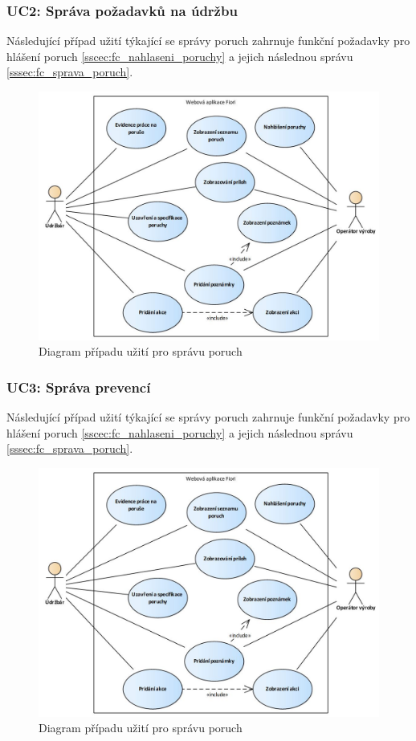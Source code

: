 \documentclass[thesis=M,czech]{FITthesis}[2012/06/26]
\begin{document}
\subsubsection{UC2: Správa požadavků na údržbu}
\label{sssec:uc_sprava_udrzby}
Následující případ užití týkající se správy poruch zahrnuje funkční požadavky pro hlášení poruch \ref{sscec:fc_nahlaseni_poruchy} a jejich následnou správu \ref{sssec:fc_sprava_poruch}.
\begin{figure}[H]
	\centering
	\includegraphics[width=1\textwidth]{images/ea_sprava_poruch.jpg}
	\caption{Diagram případu užití pro správu poruch}
	\label{img:uc_sprava_poruch}
\end{figure}
\subsubsection{UC3: Správa prevencí}
\label{sssec:uc_sprava_prevenci}
Následující případ užití týkající se správy poruch zahrnuje funkční požadavky pro hlášení poruch \ref{sscec:fc_nahlaseni_poruchy} a jejich následnou správu \ref{sssec:fc_sprava_poruch}.
\begin{figure}[H]
	\centering
	\includegraphics[width=1\textwidth]{images/ea_sprava_poruch.jpg}
	\caption{Diagram případu užití pro správu poruch}
	\label{img:uc_sprava_poruch}
\end{figure}
\end{document}
